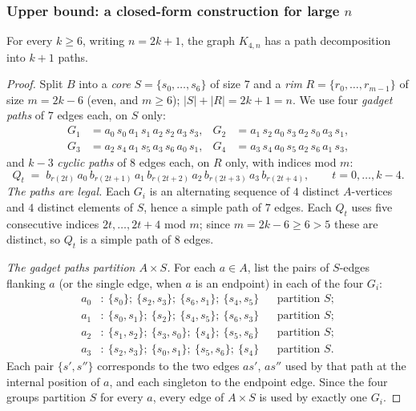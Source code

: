 \subsubsection{Upper bound: a closed-form construction for large
\texorpdfstring{$n$}{n}}

\begin{proposition}\label{prop:conk4large}
For every $k\ge6$, writing $n=2k+1$, the graph $K_{4,n}$ has a path
decomposition into $k+1$ paths.
\end{proposition}

\begin{proof}
Split $B$ into a \emph{core} $S=\{s_0,\dots,s_6\}$ of size $7$ and a
\emph{rim} $R=\{r_0,\dots,r_{m-1}\}$ of size $m=2k-6$ (even, and $m\ge6$);
$|S|+|R|=2k+1=n$. We use four \emph{gadget paths} of $7$ edges each, on
$S$ only:
\begin{align*}
G_1&=a_0\,s_0\,a_1\,s_1\,a_2\,s_2\,a_3\,s_3, &
G_2&=a_1\,s_2\,a_0\,s_3\,a_2\,s_0\,a_3\,s_1,\\
G_3&=a_2\,s_4\,a_1\,s_5\,a_3\,s_6\,a_0\,s_1, &
G_4&=a_3\,s_4\,a_0\,s_5\,a_2\,s_6\,a_1\,s_3,
\end{align*}
and $k-3$ \emph{cyclic paths} of $8$ edges each, on $R$ only, with indices
mod $m$:
\[
Q_t \;=\; b_{r(2t)}\,a_0\,b_{r(2t+1)}\,a_1\,b_{r(2t+2)}\,a_2\,b_{r(2t+3)}\,a_3\,b_{r(2t+4)},
\qquad t=0,\dots,k-4 .
\]
\emph{The paths are legal.} Each $G_i$ is an alternating sequence of $4$
distinct $A$-vertices and $4$ distinct elements of $S$, hence a simple path
of $7$ edges. Each $Q_t$ uses five consecutive indices $2t,\dots,2t+4$ mod
$m$; since $m=2k-6\ge6>5$ these are distinct, so $Q_t$ is a simple path of
$8$ edges.

\emph{The gadget paths partition $A\times S$.}
For each $a\in A$, list the pairs of $S$-edges flanking $a$ (or the single
edge, when $a$ is an endpoint) in each of the four $G_i$:
\begin{align*}
a_0&:\ \{s_0\};\ \{s_2,s_3\};\ \{s_6,s_1\};\ \{s_4,s_5\} &
&\text{partition } S;\\
a_1&:\ \{s_0,s_1\};\ \{s_2\};\ \{s_4,s_5\};\ \{s_6,s_3\} &&
\text{partition } S;\\
a_2&:\ \{s_1,s_2\};\ \{s_3,s_0\};\ \{s_4\};\ \{s_5,s_6\} &&
\text{partition } S;\\
a_3&:\ \{s_2,s_3\};\ \{s_0,s_1\};\ \{s_5,s_6\};\ \{s_4\} &&
\text{partition } S.
\end{align*}
Each pair $\{s',s''\}$ corresponds to the two edges $as'$, $as''$ used by
that path at the internal position of $a$, and each singleton to the
endpoint edge. Since the four groups partition $S$ for every $a$, every
edge of $A\times S$ is used by exactly one $G_i$.


\end{proof}
